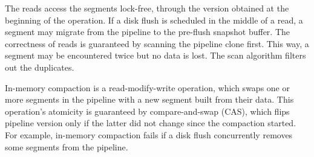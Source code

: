 The reads access the segments lock-free, through the version obtained at the beginning of the operation. If a disk flush
is scheduled in the middle of a read, a segment may migrate from the pipeline to the pre-flush snapshot buffer. The correctness of
reads  is guaranteed by scanning the pipeline clone first. This way, a segment may be encountered twice but no data is 
lost. The scan algorithm filters out the duplicates. 

In-memory compaction is a read-modify-write operation, which swaps one or more segments in the pipeline 
with a new segment built from their data. This operation's atomicity is guaranteed by compare-and-swap (CAS), 
which flips pipeline version only if the latter did not change since the compaction started.  For example, in-memory
compaction fails if a disk flush concurrently removes some segments from the pipeline.

